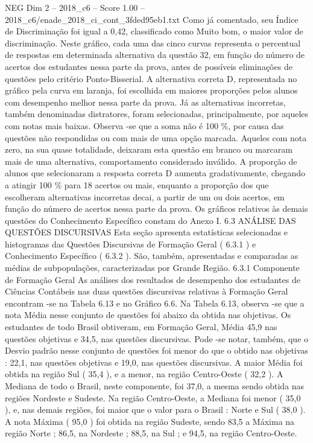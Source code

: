 \begin{textsample}{NEG Dim 2 – 2018\_c6 – Score 1.00 – 2018\_c6/enade\_2018\_ci\_cont\_3fded95eb1.txt}
Como já comentado, seu Índice de Discriminação foi igual a 0,42, classificado como Muito bom, o maior valor de discriminação.
Neste gráfico, cada uma das cinco curvas representa o percentual de respostas em determinada alternativa da questão 32, em função do número de acertos dos estudantes nessa parte da prova, antes de possíveis eliminações de questões pelo critério Ponto-Bisserial.
A alternativa correta D, representada no gráfico pela curva em laranja, foi escolhida em maiores proporções pelos alunos com desempenho melhor nessa parte da prova.
Já as alternativas incorretas, também denominadas distratores, foram selecionadas, principalmente, por aqueles com notas mais baixas.
Observa -se que a soma não é 100 \%, por causa das questões não respondidas ou com mais de uma opção marcada.
Aqueles com nota zero, na sua quase totalidade, deixaram esta questão em branco ou marcaram mais de uma alternativa, comportamento considerado inválido.
A proporção de alunos que selecionaram a resposta correta D aumenta gradativamente, chegando a atingir 100 \% para 18 acertos ou mais, enquanto a proporção dos que escolheram alternativas incorretas decai, a partir de um ou dois acertos, em função do número de acertos nessa parte da prova.
Os gráficos relativos às demais questões do Conhecimento Específico constam do Anexo I. 6.3 ANÁLISE DAS QUESTÕES DISCURSIVAS Esta seção apresenta estatísticas selecionadas e histogramas das Questões Discursivas de Formação Geral ( 6.3.1 ) e Conhecimento Específico ( 6.3.2 ).
São, também, apresentadas e comparadas as médias de subpopulações, caracterizadas por Grande Região. 6.3.1 Componente de Formação Geral As análises dos resultados de desempenho dos estudantes de Ciências Contábeis nas duas questões discursivas relativas à Formação Geral encontram -se na Tabela 6.13 e no Gráfico 6.6.
Na Tabela 6.13, observa -se que a nota Média nesse conjunto de questões foi abaixo da obtida nas objetivas.
Os estudantes de todo Brasil obtiveram, em Formação Geral, Média 45,9 nas questões objetivas e 34,5, nas questões discursivas.
Pode -se notar, também, que o Desvio padrão nesse conjunto de questões foi menor do que o obtido nas objetivas : 22,1, nas questões objetivas e 19,0, nas questões discursivas.
A maior Média foi obtida na região Sul ( 35,4 ), e a menor, na região Centro-Oeste ( 32,2 ).
A Mediana de todo o Brasil, neste componente, foi 37,0, a mesma sendo obtida nas regiões Nordeste e Sudeste.
Na região Centro-Oeste, a Mediana foi menor ( 35,0 ), e, nas demais regiões, foi maior que o valor para o Brasil : Norte e Sul ( 38,0 ).
A nota Máxima ( 95,0 ) foi obtida na região Sudeste, sendo 83,5 a Máxima na região Norte ; 86,5, na Nordeste ; 88,5, na Sul ; e 94,5, na região Centro-Oeste.

\end{textsample}
